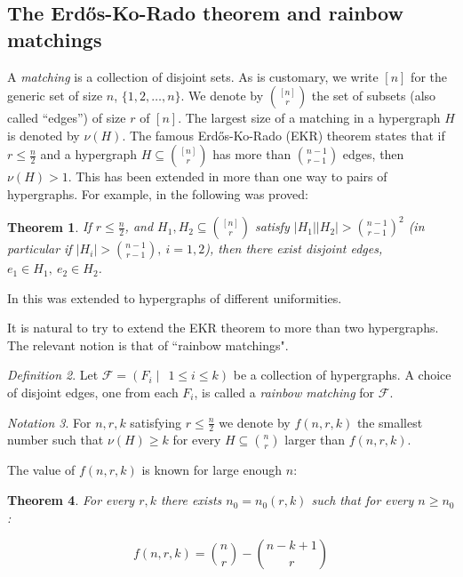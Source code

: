 \documentclass{amsart}
\newtheorem{theorem}{Theorem}[section]
\theoremstyle{remark}
\newtheorem{notation}[theorem]{Notation}
\newtheorem{definition}[theorem]{Definition}
\newcommand{\cf}{\mathcal F}
\begin{document}
\subsection{The Erd\H{o}s-Ko-Rado theorem and rainbow matchings}
A {\em matching} is a collection of disjoint sets. As is customary,
we write $[n]$ for the generic set of size $n$, $\{1, 2, \ldots,
n\}$. We denote by $\binom{[n]}{r}$ the set of subsets (also called
``edges'') of size $r$ of $[n]$.
 The largest size of a matching in a hypergraph
$H$ is denoted by $\nu(H)$. The famous Erd\H{o}s-Ko-Rado (EKR)
theorem \cite{ekr} states that if $r\le \frac{n}{2}$ and a hypergraph $H
\subseteq \binom{[n]}{r}$ has more than $\binom{n-1}{r-1}$ edges,
then $\nu(H)
>1$.  This has been extended in more
than one way to pairs of hypergraphs. For example, in \cite{mt,
pyber} the following was proved:
\begin{theorem}\label{mt}
If $r \le \frac{n}{2}$, and $H_1,H_2\subseteq \binom{[n]}{r}$ satisfy
$|H_1||H_2|>\binom{n-1}{r-1}^2$ (in particular if
 $|H_i|>\binom{n-1}{r-1},~i=1,2$),
  then there
exist disjoint edges, $e_1 \in H_1,~e_2 \in H_2$.
\end{theorem}

In \cite{mt} this was extended to hypergraphs of different uniformities.

It is natural to try to extend the EKR theorem to more than two hypergraphs. The
relevant notion is that of ``rainbow matchings".

\begin{definition}
 Let $\cf=(F_i \mid~~1 \le i \le k)$ be a collection of hypergraphs. A
 choice of disjoint edges, one from each $F_i$, is called a {\em
 rainbow matching} for $\cf$.
 \end{definition}


\begin{notation}
For $n,r,k$ satisfying $r \le \frac{n}{2}$ we denote by $f(n,r,k)$
the smallest number such that $\nu(H)\ge k$ for every $H \subseteq
\binom{n}{r}$ larger than $f(n,r,k)$. \end{notation}


The value of $f(n,r,k)$ is known for large enough $n$:

\begin{theorem} \cite{erdosplus} For every $r,k$ there exists $n_0=n_0(r,k)$ such that for every $n \ge n_0$:

$$f(n,r,k)=\binom{n}{r}-\binom{n-k+1}{r}$$
\end{theorem}
\end{document}
